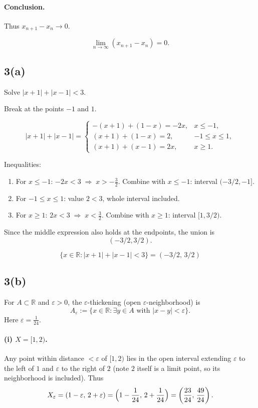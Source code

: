 \documentclass[12pt,a4paper]{article}
\theoremstyle{definition}
\theoremstyle{remark}
\begin{document}
\paragraph{Conclusion.}
Thus \(x_{n+1} - x_n \to 0\).

\[
\boxed{\lim_{n\to\infty} (x_{n+1} - x_n) = 0.}
\]

\subsection*{3(a)}
Solve \(|x+1| + |x-1| < 3\).

Break at the points \(-1\) and \(1\).

\[
|x+1| + |x-1| =
\begin{cases}
-(x+1) + (1 - x) = -2x, & x \le -1,\\[4pt]
(x+1) + (1 - x) = 2, & -1 \le x \le 1,\\[4pt]
(x+1) + (x-1) = 2x, & x \ge 1.
\end{cases}
\]

Inequalities:
\begin{enumerate}
    \item For \(x \le -1\): \(-2x < 3 \;\Longrightarrow\; x > -\tfrac{3}{2}\). Combine with \(x\le -1\): interval \((-3/2,-1]\).
    \item For \(-1 \le x \le 1\): value \(2<3\), whole interval included.
    \item For \(x \ge 1\): \(2x < 3 \;\Longrightarrow\; x < \tfrac{3}{2}\). Combine with \(x\ge 1\): interval \([1,3/2)\).
\end{enumerate}

Since the middle expression also holds at the endpoints, the union is
\[
(-3/2,3/2).
\]

\[
\boxed{\{x\in\mathbb{R} : |x+1| + |x-1| < 3\} = (-3/2,\,3/2)}
\]

\subsection*{3(b)}
For \(A \subset \mathbb{R}\) and \(\varepsilon>0\), the \(\varepsilon\)-thickening (open \(\varepsilon\)-neighborhood) is
\[
A_\varepsilon := \{x\in\mathbb{R} : \exists y\in A \text{ with } |x-y|<\varepsilon\}.
\]
Here \(\varepsilon = \frac{1}{24}\).

\paragraph{(i) \(X=[1,2)\).}
Any point within distance \(<\varepsilon\) of \([1,2)\) lies in the open interval extending \(\varepsilon\) to the left of \(1\) and \(\varepsilon\) to the right of \(2\) (note \(2\) itself is a limit point, so its neighborhood is included).
Thus
\[
X_\varepsilon = (1-\varepsilon,\,2+\varepsilon) = \Bigl(1-\frac{1}{24},\,2+\frac{1}{24}\Bigr) = \left(\frac{23}{24},\,\frac{49}{24}\right).
\]
\end{document}
